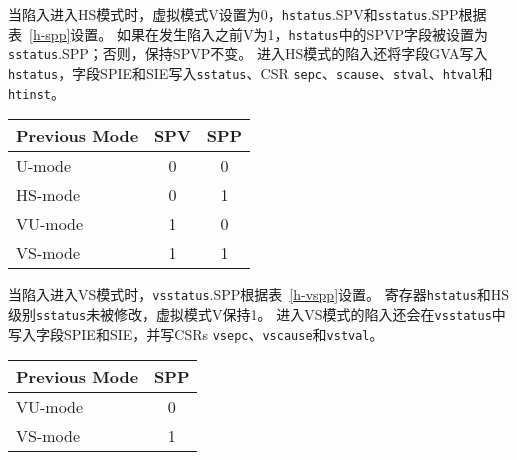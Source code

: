 当陷入进入HS模式时，虚拟模式V设置为0，{\tt hstatus}.SPV和{\tt sstatus}.SPP根据表~\ref{h-spp}设置。
如果在发生陷入之前V为1，{\tt hstatus}中的SPVP字段被设置为{\tt sstatus}.SPP；否则，保持SPVP不变。
进入HS模式的陷入还将字段GVA写入{\tt hstatus}，字段SPIE和SIE写入{\tt sstatus}、CSR {\tt sepc}、{\tt scause}、{\tt stval}、{\tt htval}和{\tt htinst}。

\begin{table*}[h!]
\begin{center}
\begin{tabular}{|l|c|c|}
  \hline
  Previous Mode & SPV & SPP \\ \hline
  U-mode        & 0   & 0   \\
  HS-mode       & 0   & 1   \\ \hline
  VU-mode       & 1   & 0   \\
  VS-mode       & 1   & 1   \\ \hline
\end{tabular}
\end{center}
\caption{在陷入到HS模式之后，{\tt hstatus}的SPV字段和{\tt sstatus}的SPP字段的值。
  }
\label{h-spp}
\end{table*}

当陷入进入VS模式时，{\tt vsstatus}.SPP根据表~\ref{h-vspp}设置。
寄存器{\tt hstatus}和HS级别{\tt sstatus}未被修改，虚拟模式V保持1。
进入VS模式的陷入还会在{\tt vsstatus}中写入字段SPIE和SIE，并写CSRs {\tt vsepc}、{\tt vscause}和{\tt vstval}。

\begin{table*}[h!]
\begin{center}
\begin{tabular}{|l|c|}
  \hline
  Previous Mode & SPP \\ \hline
  VU-mode       & 0   \\
  VS-mode       & 1   \\ \hline
\end{tabular}
\end{center}
\caption{在陷入到VS模式之后，{\tt vsstatus}的SPP字段的值。
  }
\label{h-vspp}
\end{table*}

